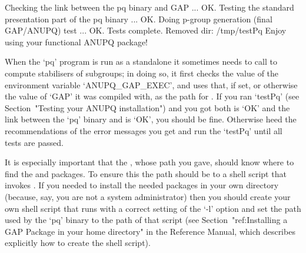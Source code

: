 Checking the link between the pq binary and GAP ... OK.
Testing the standard presentation part of the pq binary ... OK.
Doing p-group generation (final GAP/ANUPQ) test ... OK.
Tests complete.
Removed dir: /tmp/testPq
Enjoy using your functional ANUPQ package!
\endtt


When the `pq' program is run as a standalone it sometimes  needs  to call
{\GAP} to compute stabilisers of subgroups; in doing so, it first  checks
the value of the environment variable `ANUPQ_GAP_EXEC', and uses that, if
set, or otherwise the value of `GAP' it was compiled with,  as  the  path
for  {\GAP}.  If  you  ran  `testPq'  (see  Section~"Testing  your  ANUPQ
installation") and you got both {\GAP} is `OK' and the link  between  the
`pq' binary and {\GAP} is `OK', you should be fine.  Otherwise  heed  the
recommendations of the error messages you get and run the `testPq'  until
all tests are passed.

It is especially important that the {\GAP}, whose path you  gave,  should
know where to find the {\ANUPQ} and {\AutPGrp} packages. To  ensure  this
the path should be to a shell script that invokes {\GAP}. If  you  needed
to install the needed packages in your own directory (because,  say,  you
are not a system administrator) then you should  create  your  own  shell
script that runs {\GAP} with a correct setting of the `-l' option and set
the path used by the  `pq'  binary  to  the  path  of  that  script  (see
Section~"ref:Installing a GAP Package in  your  home  directory"  in  the
Reference Manual, which describes explicitly  how  to  create  the  shell
script).

